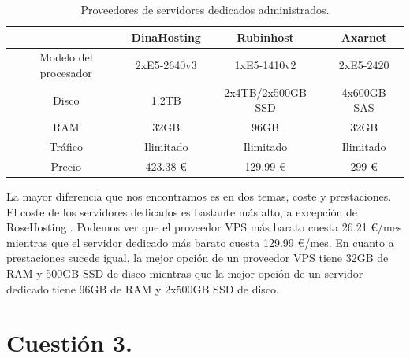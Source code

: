 \documentclass[a4paper,titlepage,12pt]{scrartcl}	%
\numberwithin{figure}{section} %
\numberwithin{table}{section} %
\begin{document}
	\begin{table}[H]
		\centering
		\begin{tabular}{|c|c|c|c|}
			\hline
			& DinaHosting \cite{DinahostingAdministrado} & Rubinhost \cite{RubinhostAdministrado} & Axarnet \cite{AxarnetAdminitrado}\\
			\hline
			Modelo del procesador & 2xE5-2640v3 & 1xE5-1410v2 & 2xE5-2420\\
			\hline
			Disco & 1.2TB & 2x4TB/2x500GB SSD & 4x600GB SAS\\
			\hline
			RAM & 32GB & 96GB & 32GB\\
			\hline
			Tráfico & Ilimitado & Ilimitado & Ilimitado\\
			\hline
			Precio & 423.38 \euro & 129.99 \euro & 299 \euro\\
			\hline
		\end{tabular}
		\caption[Proveedores de servidores dedicados administrados.]{Proveedores de servidores dedicados administrados.}
	\end{table}
	
	La mayor diferencia que nos encontramos es en dos temas, coste y prestaciones. El coste de los servidores dedicados es bastante más alto, a excepción de RoseHosting \cite{RoseHostingVPS}. Podemos ver que el proveedor VPS más barato cuesta 26.21 \euro/mes mientras que el servidor dedicado más barato cuesta 129.99 \euro/mes. En cuanto a prestaciones sucede igual, la mejor opción de un proveedor VPS tiene 32GB de RAM y 500GB SSD de disco mientras que la mejor opción de un servidor dedicado tiene 96GB de RAM y 2x500GB SSD de disco.
	
	\section[Cuestión 3.]{Cuestión 3.}
	
\end{document}
